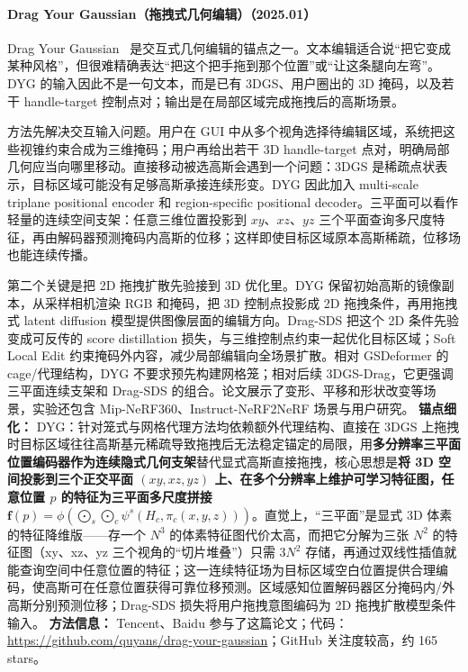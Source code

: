 \paragraph{Drag Your Gaussian（拖拽式几何编辑）（2025.01）}
Drag Your Gaussian~\cite{2501_18672} 是交互式几何编辑的锚点之一。文本编辑适合说“把它变成某种风格”，但很难精确表达“把这个把手拖到那个位置”或“让这条腿向左弯”。DYG 的输入因此不是一句文本，而是已有 3DGS、用户圈出的 3D 掩码，以及若干 handle-target 控制点对；输出是在局部区域完成拖拽后的高斯场景。

方法先解决交互输入问题。用户在 GUI 中从多个视角选择待编辑区域，系统把这些视锥约束合成为三维掩码；用户再给出若干 3D handle-target 点对，明确局部几何应当向哪里移动。直接移动被选高斯会遇到一个问题：3DGS 是稀疏点状表示，目标区域可能没有足够高斯承接连续形变。DYG 因此加入 multi-scale triplane positional encoder 和 region-specific positional decoder。三平面可以看作轻量的连续空间支架：任意三维位置投影到 $xy$、$xz$、$yz$ 三个平面查询多尺度特征，再由解码器预测掩码内高斯的位移；这样即使目标区域原本高斯稀疏，位移场也能连续传播。

第二个关键是把 2D 拖拽扩散先验接到 3D 优化里。DYG 保留初始高斯的镜像副本，从采样相机渲染 RGB 和掩码，把 3D 控制点投影成 2D 拖拽条件，再用拖拽式 latent diffusion 模型提供图像层面的编辑方向。Drag-SDS 把这个 2D 条件先验变成可反传的 score distillation 损失，与三维控制点约束一起优化目标区域；Soft Local Edit 约束掩码外内容，减少局部编辑向全场景扩散。相对 GSDeformer 的 cage/代理结构，DYG 不要求预先构建网格笼；相对后续 3DGS-Drag，它更强调三平面连续支架和 Drag-SDS 的组合。论文展示了变形、平移和形状改变等场景，实验还包含 Mip-NeRF360、Instruct-NeRF2NeRF 场景与用户研究。
\textbf{锚点细化：} DYG：针对笼式与网格代理方法均依赖额外代理结构、直接在 3DGS 上拖拽时目标区域往往高斯基元稀疏导致拖拽后无法稳定锚定的局限，用\textbf{多分辨率三平面位置编码器作为连续隐式几何支架}替代显式高斯直接拖拽，核心思想是\textbf{将 3D 空间投影到三个正交平面 $(xy,xz,yz)$ 上、在多个分辨率上维护可学习特征图，任意位置 $p$ 的特征为三平面多尺度拼接 $\mathbf{f}(p)=\phi(\bigodot_s\bigodot_c\psi^s(H_c,\pi_c(x,y,z)))$}。直觉上，``三平面''是显式 3D 体素的特征降维版——存一个 $N^3$ 的体素特征图代价太高，而把它分解为三张 $N^2$ 的特征图（xy、xz、yz 三个视角的``切片堆叠''）只需 $3N^2$ 存储，再通过双线性插值就能查询空间中任意位置的特征；这一连续特征场为目标区域空白位置提供合理编码，使高斯可在任意位置获得可靠位移预测。区域感知位置解码器区分掩码内/外高斯分别预测位移；Drag-SDS 损失将用户拖拽意图编码为 2D 拖拽扩散模型条件输入。
\textbf{方法信息：} Tencent、Baidu 参与了这篇论文；代码：\url{https://github.com/quyans/drag-your-gaussian}；GitHub 关注度较高，约 165 stars。




